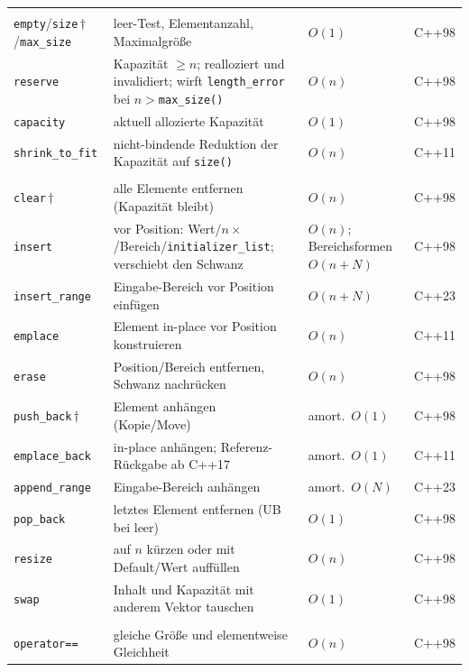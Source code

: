 \begin{longtable}{@{}>{\raggedright\arraybackslash}p{3.1cm} >{\raggedright\arraybackslash}p{5.7cm} >{\raggedright\arraybackslash}p{2.7cm} >{\raggedright\arraybackslash}p{1.1cm}@{}}
  \addlinespace[3pt]
  \multicolumn{4}{@{}l}{\textbf{Kapazität}}\\
  \addlinespace[2pt]
  \texttt{empty}/\allowbreak\texttt{size}\,$\dagger$/\allowbreak\texttt{max\_size} & leer-Test, Elementanzahl, Maximalgröße & $O(1)$ & C++98 \\
  \texttt{reserve} & Kapazität $\ge n$; realloziert und invalidiert; wirft \texttt{length\_error} bei $n>$\texttt{max\_size()} & $O(n)$ & C++98 \\
  \texttt{capacity} & aktuell allozierte Kapazität & $O(1)$ & C++98 \\
  \texttt{shrink\_to\_fit} & nicht-bindende Reduktion der Kapazität auf \texttt{size()} & $O(n)$ & C++11 \\
  \addlinespace[3pt]
  \multicolumn{4}{@{}l}{\textbf{Modifikatoren}}\\
  \addlinespace[2pt]
  \texttt{clear}\,$\dagger$ & alle Elemente entfernen (Kapazität bleibt) & $O(n)$ & C++98 \\
  \texttt{insert} & vor Position: Wert/$n\times$/Bereich/\allowbreak\texttt{initializer\_list}; verschiebt den Schwanz & $O(n)$; Bereichsformen $O(n{+}N)$ & C++98 \\
  \texttt{insert\_range} & Eingabe-Bereich vor Position einfügen & $O(n{+}N)$ & C++23 \\
  \texttt{emplace} & Element in-place vor Position konstruieren & $O(n)$ & C++11 \\
  \texttt{erase} & Position/Bereich entfernen, Schwanz nachrücken & $O(n)$ & C++98 \\
  \texttt{push\_back}\,$\dagger$ & Element anhängen (Kopie/Move) & amort.\ $O(1)$ & C++98 \\
  \texttt{emplace\_back} & in-place anhängen; Referenz-Rückgabe ab C++17 & amort.\ $O(1)$ & C++11 \\
  \texttt{append\_range} & Eingabe-Bereich anhängen & amort.\ $O(N)$ & C++23 \\
  \texttt{pop\_back} & letztes Element entfernen (UB bei leer) & $O(1)$ & C++98 \\
  \texttt{resize} & auf $n$ kürzen oder mit Default/Wert auffüllen & $O(n)$ & C++98 \\
  \texttt{swap} & Inhalt und Kapazität mit anderem Vektor tauschen & $O(1)$ & C++98 \\
  \addlinespace[3pt]
  \multicolumn{4}{@{}l}{\textbf{Nicht-Member-Funktionen}}\\
  \addlinespace[2pt]
  \texttt{operator==} & gleiche Größe und elementweise Gleichheit & $O(n)$ & C++98 \\

\end{longtable}

